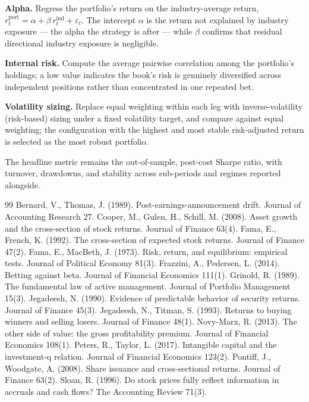 \documentclass[11pt]{article}
\begin{document}
\textbf{Alpha.} Regress the portfolio's return on the industry-average return,
$r^{\text{port}}_t = \alpha + \beta\, r^{\text{ind}}_t + \varepsilon_t$. The intercept
$\alpha$ is the return not explained by industry exposure --- the alpha the strategy is
after --- while $\beta$ confirms that residual directional industry exposure is negligible.

\textbf{Internal risk.} Compute the average pairwise correlation among the portfolio's
holdings; a low value indicates the book's risk is genuinely diversified across independent
positions rather than concentrated in one repeated bet.

\textbf{Volatility sizing.} Replace equal weighting within each leg with inverse-volatility
(risk-based) sizing under a fixed volatility target, and compare against equal weighting;
the configuration with the highest and most stable risk-adjusted return is selected as the
most robust portfolio.

The headline metric remains the out-of-sample, post-cost Sharpe ratio, with turnover,
drawdowns, and stability across sub-periods and regimes reported alongside.

\begin{thebibliography}{99}
\small
{} Bernard, V., Thomas, J. (1989). Post-earnings-announcement drift. Journal of Accounting Research 27.
 Cooper, M., Gulen, H., Schill, M. (2008). Asset growth and the cross-section of stock returns. Journal of Finance 63(4).
 Fama, E., French, K. (1992). The cross-section of expected stock returns. Journal of Finance 47(2).
 Fama, E., MacBeth, J. (1973). Risk, return, and equilibrium: empirical tests. Journal of Political Economy 81(3).
 Frazzini, A., Pedersen, L. (2014). Betting against beta. Journal of Financial Economics 111(1).
 Grinold, R. (1989). The fundamental law of active management. Journal of Portfolio Management 15(3).
 Jegadeesh, N. (1990). Evidence of predictable behavior of security returns. Journal of Finance 45(3).
 Jegadeesh, N., Titman, S. (1993). Returns to buying winners and selling losers. Journal of Finance 48(1).
 Novy-Marx, R. (2013). The other side of value: the gross profitability premium. Journal of Financial Economics 108(1).
 Peters, R., Taylor, L. (2017). Intangible capital and the investment-q relation. Journal of Financial Economics 123(2).
 Pontiff, J., Woodgate, A. (2008). Share issuance and cross-sectional returns. Journal of Finance 63(2).
 Sloan, R. (1996). Do stock prices fully reflect information in accruals and cash flows? The Accounting Review 71(3).
\end{thebibliography}
\end{document}
